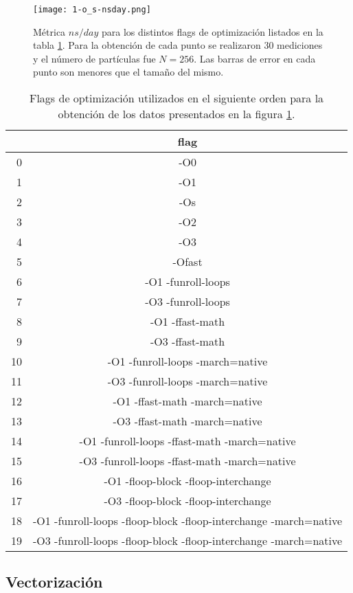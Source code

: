 \documentclass[a4paper,spanish,12pt,twoside]{article}
\begin{document}
\begin{figure}[h]
	\centering
	\texttt{[image: 1-o\_s-nsday.png]}
	\caption{Métrica $ns/day$ para los distintos flags de optimización listados en la tabla \ref{tab:os-flags}. Para la obtención de cada punto se realizaron 30 mediciones y el número de partículas fue $N = 256$. Las barras de error en cada punto son menores que el tamaño del mismo.}
	\label{fig:os-nsday}
\end{figure}
\begin{table}[h]
	\centering
	\caption{Flags de optimización utilizados en el siguiente orden para la obtención de los datos presentados en la figura \ref{fig:os-nsday}.}
	\label{tab:os-flags}
	\begin{tabular}{|r|c|}
		\hline
	       & flag \\ \hline
		 0 & -O0  \\
		 1 & -O1  \\
		 2 & -Os  \\
		 3 & -O2  \\
		 4 & -O3  \\
		 5 & -Ofast \\
		 6 & -O1 -funroll-loops \\
		 7 & -O3 -funroll-loops \\
		 8 & -O1 -ffast-math \\
		 9 & -O3 -ffast-math \\
		10 & -O1 -funroll-loops -march=native \\
		11 & -O3 -funroll-loops -march=native \\
		12 & -O1 -ffast-math -march=native \\
		13 & -O3 -ffast-math -march=native \\
		14 & -O1 -funroll-loops -ffast-math -march=native \\
		15 & -O3 -funroll-loops -ffast-math -march=native \\
		16 & -O1 -floop-block -floop-interchange \\
		17 & -O3 -floop-block -floop-interchange \\
		18 & -O1 -funroll-loops -floop-block -floop-interchange -march=native \\
		19 & -O3 -funroll-loops -floop-block -floop-interchange -march=native \\ \hline
	\end{tabular}
\end{table}


\subsection{Vectorización}
\end{document}
